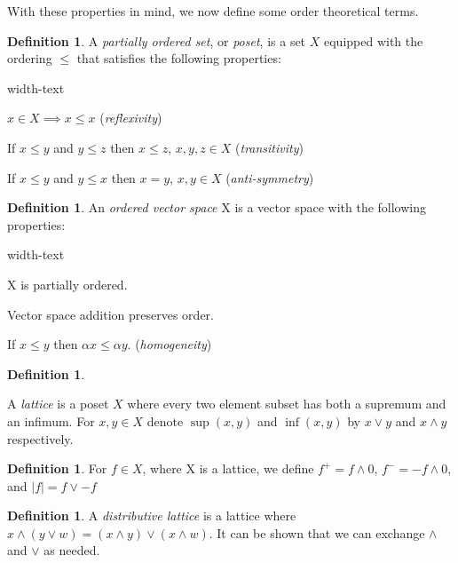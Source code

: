 \documentclass[letterpaper,10pt,oneside,onecolumn,reqno]{amsart}
\theoremstyle{definition}
\newtheorem{defn}[thm]{Definition}
\newcommand{\meet}{\wedge}
\newcommand{\join}{\vee}
\begin{document}
With these properties in mind, we now define some order theoretical terms.

\begin{defn}\label{def:2}
A \emph{partially ordered set}, or \emph{poset}, is a set $X$ equipped with the ordering $\leq$ that satisfies the following properties:

\begin{deflist}{width-text}
\item $x \in X \implies x \leq x$ (\emph{reflexivity})
\item If $x \leq y$ and $y \leq z$ then $x \leq z$, $x,y,z \in X$ (\emph{transitivity})
\item If $x \leq y$ and $y \leq x$ then $x = y$, $x,y \in X$ (\emph{anti-symmetry})
\end{deflist}
\end{defn}

\begin{defn}\label{def:3}
An \emph{ordered vector space} X is a vector space with the following properties:

\begin{deflist}{width-text}
\item X is partially ordered.
\item Vector space addition preserves order.
\item If $x \leq y$ then $\alpha x \leq \alpha y$. (\emph{homogeneity})
\end{deflist}
\end{defn}

\begin{defn}\label{def:4}

A \emph{lattice} is a poset $X$ where every two element subset has both a supremum and an infimum. For $x, y \in X$ denote $\sup(x,y)$ and $\inf(x,y)$ by $x \join y$ and $x \meet y$ respectively. 
\end{defn}

\begin{defn}\label{def:5}
For $f \in X$, where X is a lattice, we define $f^+=f \meet 0$, $f^-=-f \meet 0$, and $|f| = f \join -f$
\end{defn}

\begin{defn}\label{def:6}
A \emph{distributive lattice} is a lattice where $x \meet (y \join w) = (x \meet y) \join (x \meet w)$. It can be shown that we can exchange $\meet$ and $\join$ as needed.
\end{defn}
\end{document}
